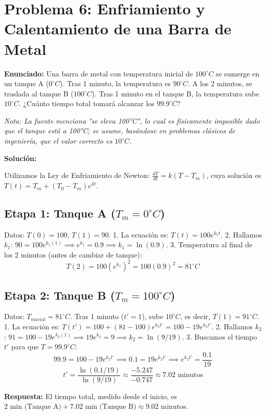 \documentclass[a4paper]{article}
\begin{document}
\section{Problema 6: Enfriamiento y Calentamiento de una Barra de Metal}

\textbf{Enunciado:} Una barra de metal con temperatura inicial de $100^\circ C$ se sumerge en un tanque A ($0^\circ C$). Tras 1 minuto, la temperatura es $90^\circ C$. A los 2 minutos, se traslada al tanque B ($100^\circ C$). Tras 1 minuto en el tanque B, la temperatura sube $10^\circ C$. ¿Cuánto tiempo total tomará alcanzar los $99.9^\circ C$?

\textit{Nota: La fuente menciona "se eleva 100°C", lo cual es físicamente imposible dado que el tanque está a 100°C; se asume, basándose en problemas clásicos de ingeniería, que el valor correcto es $10^\circ C$.}

\textbf{Solución:}

Utilizamos la Ley de Enfriamiento de Newton: $\frac{dT}{dt} = k(T - T_m)$, cuya solución es $T(t) = T_m + (T_0 - T_m)e^{kt}$.

\subsection*{Etapa 1: Tanque A ($T_m = 0^\circ C$)}
Datos: $T(0) = 100$, $T(1) = 90$.
1. La ecuación es: $T(t) = 100e^{k_1 t}$.
2. Hallamos $k_1$: $90 = 100e^{k_1(1)} \implies e^{k_1} = 0.9 \implies k_1 = \ln(0.9)$.
3. Temperatura al final de los 2 minutos (antes de cambiar de tanque):
$$T(2) = 100(e^{k_1})^2 = 100(0.9)^2 = 81^\circ C$$

\subsection*{Etapa 2: Tanque B ($T_m = 100^\circ C$)}
Datos: $T_{inicial} = 81^\circ C$. Tras 1 minuto ($t'=1$), sube $10^\circ C$, es decir, $T(1) = 91^\circ C$.
1. La ecuación es: $T(t') = 100 + (81 - 100)e^{k_2 t'} = 100 - 19e^{k_2 t'}$.
2. Hallamos $k_2$: $91 = 100 - 19e^{k_2(1)} \implies 19e^{k_2} = 9 \implies k_2 = \ln(9/19)$.
3. Buscamos el tiempo $t'$ para que $T = 99.9^\circ C$:
$$99.9 = 100 - 19e^{k_2 t'} \implies 0.1 = 19e^{k_2 t'} \implies e^{k_2 t'} = \frac{0.1}{19}$$
$$t' = \frac{\ln(0.1/19)}{\ln(9/19)} \approx \frac{-5.247}{-0.747} \approx 7.02 \text{ minutos}$$

\textbf{Respuesta:} El tiempo total, medido desde el inicio, es $2 \text{ min (Tanque A)} + 7.02 \text{ min (Tanque B)} \approx 9.02 \text{ minutos}$.
\end{document}
